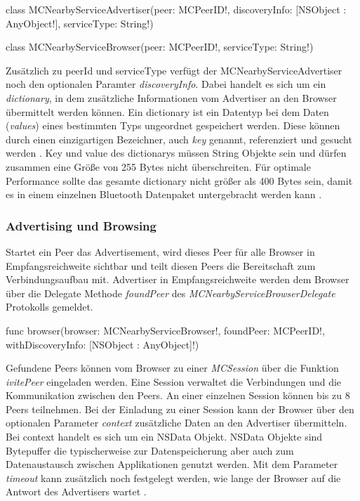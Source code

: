 \begin{description}
  \item \textcolor{class}{class} MCNearbyServiceAdvertiser(peer: \textcolor{parameter}{MCPeerID!}, discoveryInfo: \textcolor{parameter}{[NSObject : AnyObject!]}, serviceType: \textcolor{parameter}{String!})
  \item  \textcolor{class}{class} MCNearbyServiceBrowser(peer: \textcolor{parameter}{MCPeerID!}, serviceType: \textcolor{parameter}{String!})
\end{description}

Zusätzlich zu peerId und serviceType verfügt der MCNearbyServiceAdvertiser noch den optionalen Paramter \textit{discoveryInfo}. Dabei handelt es sich um ein \textit{dictionary}, in dem zusätzliche Informationen vom Advertiser an den Browser übermittelt werden können. Ein dictionary ist ein Datentyp bei dem Daten (\textit{values}) eines bestimmten Typs ungeordnet gespeichert werden. Diese können durch einen einzigartigen Bezeichner, auch \textit{key} genannt, referenziert und gesucht werden \cite{AppleCollectionTypes:Online}. Key und value des dictionarys müssen String Objekte sein und dürfen zusammen eine Größe von 255 Bytes nicht überschreiten. Für optimale Performance sollte das gesamte dictionary nicht größer als 400 Bytes sein, damit es in einem einzelnen Bluetooth Datenpaket untergebracht werden kann \cite{AppleMCNearbyServiceAdvertiser:Online}.

\subsubsection{Advertising und Browsing}
Startet ein Peer das Advertisement, wird dieses Peer für alle Browser in Empfangsreichweite sichtbar und teilt diesen Peers die Bereitschaft zum Verbindungsaufbau mit. Advertiser in Empfangsreichweite werden dem Browser über die Delegate Methode \textit{foundPeer} des \textit{MCNearbyServiceBrowserDelegate} Protokolls gemeldet. 

\begin{description}  
  \item \textcolor{type}{func} browser(browser: \textcolor{parameter}{MCNearbyServiceBrowser!}, foundPeer: \textcolor{parameter}{ MCPeerID!}, withDiscoveryInfo: \textcolor{parameter}{[NSObject : AnyObject]!})
\end{description}

Gefundene Peers können vom Browser zu einer \textit{MCSession} über die Funktion \textit{ivitePeer} eingeladen werden. Eine Session verwaltet die Verbindungen und die Kommunikation zwischen den Peers. An einer einzelnen Session können bis zu 8 Peers teilnehmen. Bei der Einladung zu einer Session kann der Browser über den optionalen Parameter \textit{context} zusätzliche Daten an den Advertiser übermitteln. Bei context handelt es sich um ein NSData Objekt. NSData Objekte sind Bytepuffer die typischerweise zur Datenspeicherung aber auch zum Datenaustausch zwischen Applikationen genutzt werden. Mit dem Parameter \textit{timeout} kann zusätzlich noch festgelegt werden, wie lange der Browser auf die Antwort des Advertisers wartet \cite{AppleNSData:Online}.

